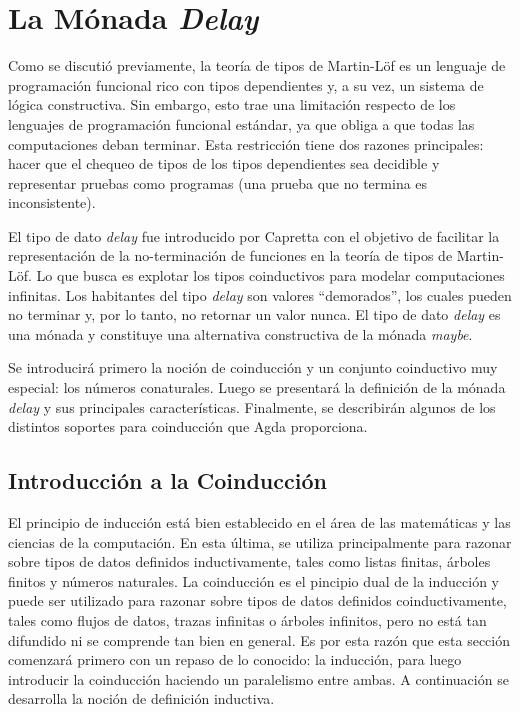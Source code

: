 \chapter{La Mónada \textit{Delay}}\label{chapter:delay}

Como se discutió previamente, la teoría de tipos de Martin-Löf es un lenguaje de programación funcional rico con tipos dependientes y, a su vez, un sistema de lógica constructiva. Sin embargo, esto trae una limitación respecto de los lenguajes de programación funcional estándar, ya que obliga a que todas las computaciones deban terminar. Esta restricción tiene dos razones principales: hacer que el chequeo de tipos de los tipos dependientes sea decidible y representar pruebas como programas (una prueba que no termina es inconsistente). 

El tipo de dato \textit{delay} fue introducido por Capretta \cite{capretta:2005} con el objetivo de facilitar la representación de la no-terminación de funciones en la teoría de tipos de Martin-Löf. Lo que busca es explotar los tipos coinductivos para modelar computaciones infinitas. Los habitantes del tipo \textit{delay} son valores ``demorados'', los cuales pueden no terminar y, por lo tanto, no retornar un valor nunca. El tipo de dato \textit{delay} es una mónada y constituye una alternativa constructiva de la mónada \textit{maybe}. 

Se introducirá primero la noción de coinducción y un conjunto coinductivo muy especial: los números conaturales. Luego se presentará la definición de la mónada \textit{delay} y sus principales características. Finalmente, se describirán algunos de los distintos soportes para coinducción que Agda proporciona. 

\section{Introducción a la Coinducción}\label{delay:coind}

El principio de inducción está bien establecido en el área de las matemáticas y las ciencias de la computación. En esta última, se utiliza principalmente para razonar sobre tipos de datos definidos inductivamente, tales como listas finitas, árboles finitos y números naturales. La coinducción es el pincipio dual de la inducción y puede ser utilizado para razonar sobre tipos de datos definidos coinductivamente, tales como flujos de datos, trazas infinitas o árboles infinitos, pero no está tan difundido ni se comprende tan bien en general. Es por esta razón que esta sección comenzará primero con un repaso de lo conocido: la inducción, para luego introducir la coinducción haciendo un paralelismo entre ambas. A continuación se desarrolla la noción de definición inductiva. 

